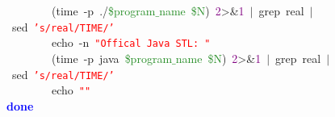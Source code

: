 \documentclass[table, usenames,dvipsnames,svgnames]{beamer}
\begin{document}
\begin{frame}
\begin{center}
\begin{minipage}{110mm}
\begin{block}
\mbox{}\ \ \ \ \ \ \ \ \textcolor{BrickRed}{(}time\ -p\ \textcolor{BrickRed}{./}\textcolor{ForestGreen}{\$program$\_$name}\ \textcolor{ForestGreen}{\$N}\textcolor{BrickRed}{)}\ \textcolor{Purple}{2}\textcolor{BrickRed}{\textgreater{}\&}\textcolor{Purple}{1}\ \textcolor{BrickRed}{$|$}\ grep\ real\ \textcolor{BrickRed}{$|$}\ sed\ \texttt{\textcolor{Red}{'s/real/TIME/'}} \\
\mbox{}\ \ \ \ \ \ \ \ echo\ -n\ \texttt{\textcolor{Red}{"{}Offical\ Java\ STL:\ "{}}} \\
\mbox{}\ \ \ \ \ \ \ \ \textcolor{BrickRed}{(}time\ -p\ java\ \textcolor{ForestGreen}{\$program$\_$name}\ \textcolor{ForestGreen}{\$N}\textcolor{BrickRed}{)}\ \textcolor{Purple}{2}\textcolor{BrickRed}{\textgreater{}\&}\textcolor{Purple}{1}\ \textcolor{BrickRed}{$|$}\ grep\ real\ \textcolor{BrickRed}{$|$}\ sed\ \texttt{\textcolor{Red}{'s/real/TIME/'}} \\
\mbox{}\ \ \ \ \ \ \ \ echo\ \texttt{\textcolor{Red}{"{}"{}}} \\
\mbox{}\textbf{\textcolor{Blue}{done}}
\end{block}
\end{minipage}\end{center}

\end{frame}
\end{document}
